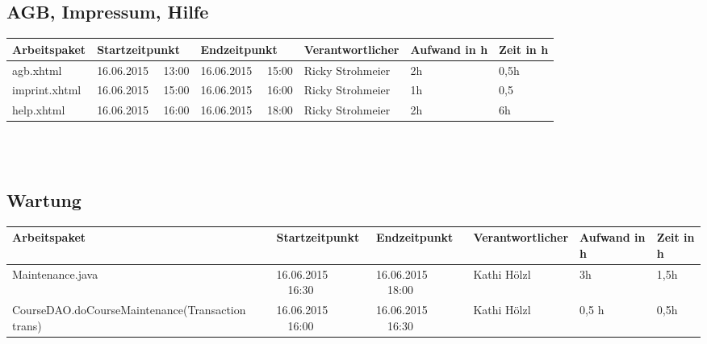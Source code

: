 \begin{landscape}
	\subsection{AGB, Impressum, Hilfe}
	\begin{tabular}{|p{10.3cm}|p{3.2cm}|p{3.2cm}|p{3.5cm}|p{1.7cm}|p{1.5cm}|}
		\hline  \textbf{Arbeitspaket} & \textbf{Startzeitpunkt} & \textbf{Endzeitpunkt} & \textbf{Verantwortlicher}  & \textbf{Aufwand in h} & \textbf{Zeit in h}\\
		\hline   agb.xhtml          & 16.06.2015 \ \ 13:00        & 16.06.2015 \ \ 15:00        & Ricky Strohmeier &  2h                 & 0,5h\\
		\hline   imprint.xhtml      & 16.06.2015 \ \ 15:00        & 16.06.2015 \ \ 16:00        & Ricky Strohmeier &  1h                 & 0,5\\
		\hline   help.xhtml         & 16.06.2015 \ \ 16:00        & 16.06.2015 \ \ 18:00        & Ricky Strohmeier &  2h                 & 6h\\
		\hline 
	\end{tabular} \ \\
	\ \\	
	
	\subsection{Wartung}
	\begin{tabular}{|p{10.3cm}|p{3.2cm}|p{3.2cm}|p{3.5cm}|p{1.7cm}|p{1.5cm}|}
		\hline  \textbf{Arbeitspaket} & \textbf{Startzeitpunkt} & \textbf{Endzeitpunkt} & \textbf{Verantwortlicher}  & \textbf{Aufwand in h} & \textbf{Zeit in h}\\ 
		\hline   Maintenance.java         & 16.06.2015 \ \ 16:30       & 16.06.2015  \ \  18:00        & Kathi Hölzl &  3h  &  1,5h \\
		\hline   CourseDAO.doCourseMaintenance(Transaction trans)         & 16.06.2015 \ \ 16:00       & 16.06.2015  \ \  16:30        & Kathi Hölzl &  0,5 h  &  0,5h \\
		\hline
	\end{tabular}	
	

				
\end{landscape}